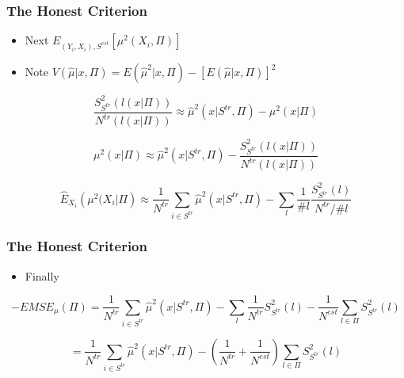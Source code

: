 \documentclass[
  shownotes,
  xcolor={svgnames},
  hyperref={colorlinks,citecolor=DarkBlue,linkcolor=DarkRed,urlcolor=DarkBlue}
  , aspectratio=169]{beamer}
\begin{document}
\begin{frame}[fragile]
\frametitle{The Honest Criterion}


\begin{itemize}
  \item Next $E_{(Y_{i},X_{i}),S^{est}}\left[\mu^{2}(X_{i},\Pi)\right]$
  \item Note $V(\hat{\mu}|x,\Pi)=E(\hat{\mu}^{2}|x,\Pi)-\left[E(\hat{\mu}|x,\Pi)\right]^{2}$
\end{itemize}




\[
\frac{S_{S^{tr}}^{2}\left(l\left(x|\Pi\right)\right)}{N^{tr}\left(l\left(x|\Pi\right)\right)}\approx\hat{\mu}^{2}(x|S^{tr},\Pi)-\mu^{2}(x|\Pi)
\]

\[
\mu^{2}(x|\Pi)\approx\hat{\mu}^{2}(x|S^{tr},\Pi)-\frac{S_{S^{tr}}^{2}\left(l\left(x|\Pi\right)\right)}{N^{tr}\left(l\left(x|\Pi\right)\right)}
\]

\[
\hat{E}_{X_{i}}\left(\mu^{2}(X_{i}|\Pi\right)\approx\frac{1}{N^{tr}}\sum_{i\in S^{tr}}\hat{\mu}^{2}(x|S^{tr},\Pi)-\sum_{l}\frac{1}{\#l}\frac{S_{S^{tr}}^{2}\left(l\right)}{N^{tr}/\#l}
\]

\end{frame}
\begin{frame}[fragile]
\frametitle{The Honest Criterion}


\begin{itemize}
  \item Finally
\end{itemize}

\[
-EMSE_{\mu}(\Pi)=\frac{1}{N^{tr}}\sum_{i\in S^{tr}}\hat{\mu}^{2}(x|S^{tr},\Pi)-\sum_{l}\frac{1}{N^{tr}}S_{S^{tr}}^{2}\left(l\right)-\frac{1}{N^{est}}\sum_{l\in\Pi}S_{S^{tr}}^{2}\left(l\right)
\]

\[
=\frac{1}{N^{tr}}\sum_{i\in S^{tr}}\hat{\mu}^{2}(x|S^{tr},\Pi)-\left(\frac{1}{N^{tr}}+\frac{1}{N^{est}}\right)\sum_{l\in\Pi}S_{S^{tr}}^{2}\left(l\right)
\]

\end{frame}
\end{document}
